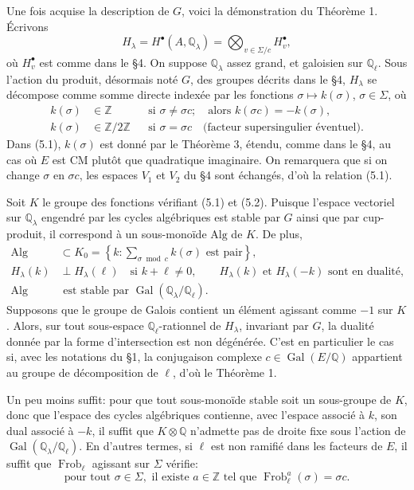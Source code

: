 \documentclass[11pt]{article}
\newcommand{\Q}{\mathbb Q}
\newcommand{\Z}{\mathbb Z}
\newcommand{\Gal}{\operatorname{Gal}}
\theoremstyle{deligne}
\newcommand{\heading}[1]{\vspace{0.7em}\noindent{\bfseries #1}\quad}
\begin{document}
\heading{5.}
Une fois acquise la description de $G$, voici la démonstration du Théorème 1. Écrivons
\[
H_\lambda=H^\bullet(A,\Q_\lambda)=\bigotimes_{v\in\Sigma/c}H_v^\bullet,
\]
où $H_v^\bullet$ est comme dans le \S4. On suppose $\Q_\lambda$ assez grand, et galoisien sur $\Q_\ell$. Sous l'action du produit, désormais noté $G$, des groupes décrits dans le \S4, $H_\lambda$ se décompose comme somme directe indexée par les fonctions $\sigma\mapsto k(\sigma)$, $\sigma\in\Sigma$, où
\begin{align}
\tag{5.1} k(\sigma)&\in\Z &&\text{si }\sigma\ne\sigma c;\quad\text{alors }k(\sigma c)=-k(\sigma),\\
\tag{5.2} k(\sigma)&\in\Z/2\Z &&\text{si }\sigma=\sigma c\quad\text{(facteur supersingulier éventuel).}
\end{align}
Dans (5.1), $k(\sigma)$ est donné par le Théorème 3, étendu, comme dans le \S4, au cas où $E$ est CM plutôt que quadratique imaginaire. On remarquera que si on change $\sigma$ en $\sigma c$, les espaces $V_1$ et $V_2$ du \S4 sont échangés, d'où la relation (5.1).

Soit $K$ le groupe des fonctions vérifiant (5.1) et (5.2). Puisque l'espace vectoriel sur $\Q_\lambda$ engendré par les cycles algébriques est stable par $G$ ainsi que par cup-produit, il correspond à un sous-monoïde $\mathrm{Alg}$ de $K$. De plus,
\begin{align}
\tag{5.3} \mathrm{Alg}&\subset K_0=\left\{k:\sum_{\sigma\bmod c}k(\sigma)\text{ est pair}\right\},\\
\tag{5.4} H_\lambda(k)&\perp H_\lambda(\ell)\quad\text{si }k+\ell\ne0,\qquad
H_\lambda(k)\text{ et }H_\lambda(-k)\text{ sont en dualité},\\
\tag{5.5} \mathrm{Alg}&\text{ est stable par }\Gal(\Q_\lambda/\Q_\ell).
\end{align}
Supposons que le groupe de Galois contient un élément agissant comme $-1$ sur $K$. Alors, sur tout sous-espace $\Q_\ell$-rationnel de $H_\lambda$, invariant par $G$, la dualité donnée par la forme d'intersection est non dégénérée. C'est en particulier le cas si, avec les notations du \S1, la conjugaison complexe $c\in\Gal(E/\Q)$ appartient au groupe de décomposition de $\ell$, d'où le Théorème 1.

Un peu moins suffit: pour que tout sous-monoïde stable soit un sous-groupe de $K$, donc que l'espace des cycles algébriques contienne, avec l'espace associé à $k$, son dual associé à $-k$, il suffit que $K\otimes\Q$ n'admette pas de droite fixe sous l'action de $\Gal(\Q_\lambda/\Q_\ell)$. En d'autres termes, si $\ell$ est non ramifié dans les facteurs de $E$, il suffit que $\operatorname{Frob}_\ell$ agissant sur $\Sigma$ vérifie:
\[
\text{pour tout }\sigma\in\Sigma,\text{ il existe }a\in\Z\text{ tel que }\operatorname{Frob}_\ell^a(\sigma)=\sigma c.
\]
\end{document}
